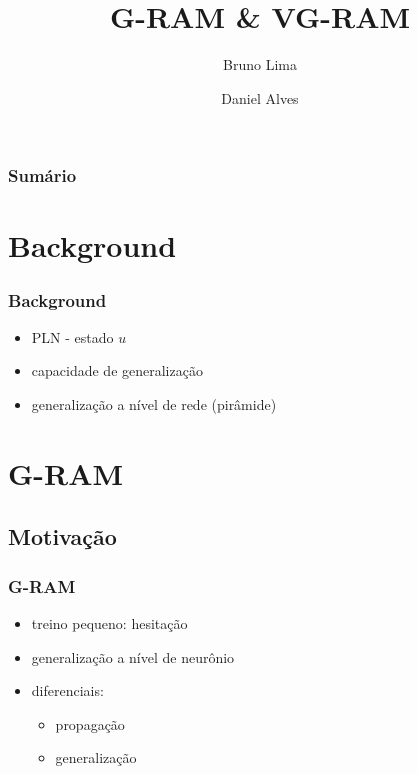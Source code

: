 \documentclass{beamer}
\title{G-RAM \& VG-RAM}
\author{Bruno Lima \and Daniel Alves}
\date{}
\begin{document}
\titlepage

\begin{frame}
    \frametitle{Sumário}
    \tableofcontents
\end{frame}
\section{Background}
\begin{frame}
    \frametitle{Background}
    \begin{itemize}
        \item PLN - estado $u$
        \item capacidade de generalização
        \item generalização a nível de rede (pirâmide)
    \end{itemize}
\end{frame}
\section{G-RAM}
\subsection{Motivação}
\begin{frame}
    \frametitle{G-RAM}
    \begin{itemize}
        \item treino pequeno: hesitação
        \item generalização a nível de neurônio
        \item diferenciais:
            \begin{itemize}
                \item propagação
                \item generalização
            \end{itemize}
    \end{itemize}
\end{frame}
\end{document}
